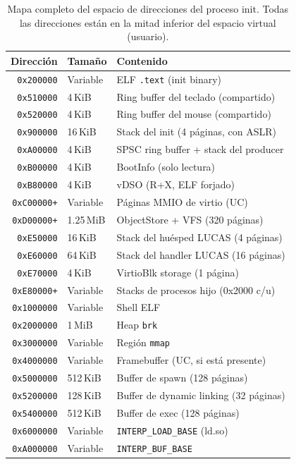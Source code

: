 \documentclass[11pt,twoside,openright]{book}
\theoremstyle{definition}
\theoremstyle{plain}
\theoremstyle{remark}
\begin{document}
\begin{table}[ht]
\centering
\caption{Mapa completo del espacio de direcciones del proceso init. Todas las
direcciones están en la mitad inferior del espacio virtual (usuario).}
\label{tab:addr-layout}
\begin{tabular}{@{}rll@{}}
\toprule
\textbf{Dirección} & \textbf{Tamaño} & \textbf{Contenido} \\
\midrule
\texttt{0x200000}   & Variable  & ELF \texttt{.text} (init binary) \\
\texttt{0x510000}   & 4\,KiB    & Ring buffer del teclado (compartido) \\
\texttt{0x520000}   & 4\,KiB    & Ring buffer del mouse (compartido) \\
\texttt{0x900000}   & 16\,KiB   & Stack del init (4 páginas, con ASLR) \\
\texttt{0xA00000}   & 4\,KiB    & SPSC ring buffer + stack del producer \\
\texttt{0xB00000}   & 4\,KiB    & BootInfo (solo lectura) \\
\texttt{0xB80000}   & 4\,KiB    & vDSO (R+X, ELF forjado) \\
\texttt{0xC00000+}  & Variable  & Páginas MMIO de virtio (UC) \\
\texttt{0xD00000+}  & 1.25\,MiB & ObjectStore + VFS (320 páginas) \\
\texttt{0xE50000}   & 16\,KiB   & Stack del huésped LUCAS (4 páginas) \\
\texttt{0xE60000}   & 64\,KiB   & Stack del handler LUCAS (16 páginas) \\
\texttt{0xE70000}   & 4\,KiB    & VirtioBlk storage (1 página) \\
\texttt{0xE80000+}  & Variable  & Stacks de procesos hijo (0x2000 c/u) \\
\texttt{0x1000000}  & Variable  & Shell ELF \\
\texttt{0x2000000}  & 1\,MiB    & Heap \texttt{brk} \\
\texttt{0x3000000}  & Variable  & Región \texttt{mmap} \\
\texttt{0x4000000}  & Variable  & Framebuffer (UC, si está presente) \\
\texttt{0x5000000}  & 512\,KiB  & Buffer de spawn (128 páginas) \\
\texttt{0x5200000}  & 128\,KiB  & Buffer de dynamic linking (32 páginas) \\
\texttt{0x5400000}  & 512\,KiB  & Buffer de exec (128 páginas) \\
\texttt{0x6000000}  & Variable  & \texttt{INTERP\_LOAD\_BASE} (ld.so) \\
\texttt{0xA000000}  & Variable  & \texttt{INTERP\_BUF\_BASE} \\
\bottomrule
\end{tabular}
\end{table}
\end{document}

